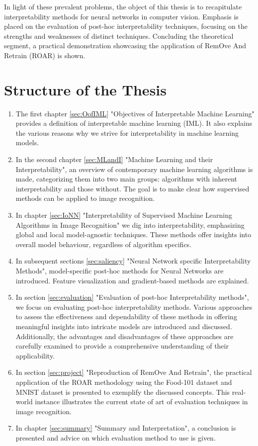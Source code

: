 In light of these prevalent problems, the object of this thesis is to recapitulate interpretability methods for neural networks in computer vision. Emphasis is placed on the evaluation of post-hoc interpretability techniques, focusing on the strengths and weaknesses of distinct techniques. Concluding the theoretical segment, a practical demonstration showcasing the application of RemOve And Retrain (ROAR) \cite{hooker2019benchmark} is shown. 

\section{Structure of the Thesis}

\begin{enumerate}
	\item The first chapter \ref{sec:OofIML} "Objectives of Interpretable Machine Learning" provides a definition of interpretable machine learning (IML). It also explains the various reasons why we strive for interpretability in machine learning models.
	\item In the second chapter \ref{sec:MLandI} "Machine Learning and their Interpretability", an overview of contemporary machine learning algorithms is made, categorizing them into two main groups: algorithms with inherent interpretability and those without. The goal is to make clear how supervised methods can be applied to image recognition.
	\item In chapter \ref{sec:IoNN} "Interpretability of Supervised Machine Learning Algorithms in Image Recognition" we dig into interpretability, emphasizing global and local model-agnostic techniques. These methods offer insights into overall model behaviour, regardless of algorithm specifics. 
	\item In subsequent sections \ref{sec:saliency} "Neural Network specific Interpretability Methods", model-specific post-hoc methods for Neural Networks are introduced. Feature visualization and gradient-based methods are explained.
	\item In section \ref{sec:evaluation} "Evaluation of post-hoc Interpretability methods", we focus on evaluating post-hoc interpretability methods. Various approaches to assess the effectiveness and dependability of these methods in offering meaningful insights into intricate models are introduced and discussed. Additionally, the advantages and disadvantages of these approaches are carefully examined to provide a comprehensive understanding of their applicability.
	\item In section \ref{sec:project} "Reproduction of RemOve And Retrain", the practical application of the ROAR methodology using the Food-101 dataset \cite{bossard14} and MNIST dataset \cite{deng2012mnist} is presented to exemplify the discussed concepts. This real-world instance illustrates the current state of art of evaluation techniques in image recognition.
	\item In chapter \ref{sec:summary} "Summary and Interpretation", a conclusion is presented and advice on which evaluation method to use is given. 
\end{enumerate}

